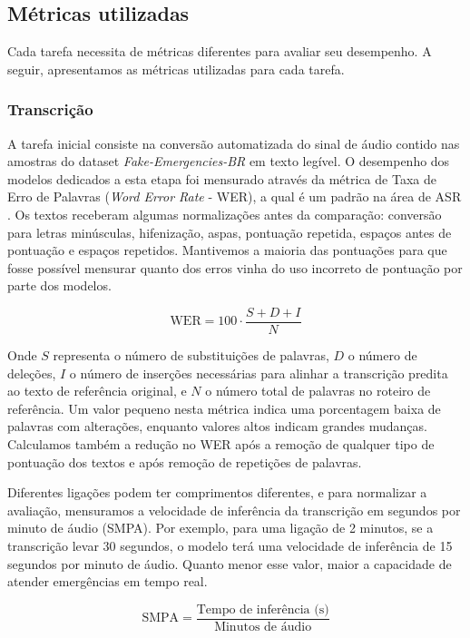 \documentclass{IEEEphot}
\begin{document}
\subsection{Métricas utilizadas}

Cada tarefa necessita de métricas diferentes para avaliar seu desempenho. A seguir, apresentamos as métricas utilizadas para cada tarefa.

\subsubsection{Transcrição}

A tarefa inicial consiste na conversão automatizada do sinal de áudio contido nas amostras do dataset \textit{Fake-Emergencies-BR} em texto legível. O desempenho dos modelos dedicados a esta etapa foi mensurado através da métrica de Taxa de Erro de Palavras (\textit{Word Error Rate} - WER), a qual é um padrão na área de ASR \cite{nlp_jurafsky}. Os textos receberam algumas normalizações antes da comparação: conversão para letras minúsculas, hifenização, aspas, pontuação repetida, espaços antes de pontuação e espaços repetidos. Mantivemos a maioria das pontuações para que fosse possível mensurar quanto dos erros vinha do uso incorreto de pontuação por parte dos modelos.

\begin{equation}
\text{WER} = 100 \cdot \frac{S + D + I}{N}
\end{equation}

Onde $S$ representa o número de substituições de palavras, $D$ o número de deleções, $I$ o número de inserções necessárias para alinhar a transcrição predita ao texto de referência original, e $N$ o número total de palavras no roteiro de referência. Um valor pequeno nesta métrica indica uma porcentagem baixa de palavras com alterações, enquanto valores altos indicam grandes mudanças. Calculamos também a redução no WER após a remoção de qualquer tipo de pontuação dos textos e após remoção de repetições de palavras.

Diferentes ligações podem ter comprimentos diferentes, e para normalizar a avaliação, mensuramos a velocidade de inferência da transcrição em segundos por minuto de áudio (SMPA). Por exemplo, para uma ligação de 2 minutos, se a transcrição levar 30 segundos, o modelo terá uma velocidade de inferência de 15 segundos por minuto de áudio. Quanto menor esse valor, maior a capacidade de atender emergências em tempo real.

\begin{equation}
    \text{SMPA} = \frac{\text{Tempo de inferência (s)}}{\text{Minutos de áudio}}
\end{equation}
\end{document}
